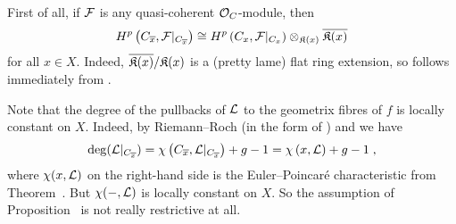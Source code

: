 \documentclass[a4paper,parskip=half,numbers=enddot, DIV=12]{scrreprt}
\begin{document}
\begin{rem}
	\begin{alphanumerate}
		\item {}First of all, if $\mathcal{F}$ is any quasi-coherent $\mathcal{O}_C$-module, then
		\begin{align}\lbl{eq:GeometricFibreIso}
		H^p\left(C_{\ov{x}},\Ff|_{C_{\ov{x}}}\right)\cong H^p\left(C_x,\Ff|_{C_x}\right)\otimes_{\KK(x)}\ov{\KK(x)}
		\end{align}
		for all $x\in X$. Indeed, $\overline{\mathfrak{K}(x)}/\mathfrak{K}(x)$ is a (pretty lame) flat ring extension, so  follows immediately from .
		\item Note that the degree of the pullbacks of $\mathcal{L}$ to the geometrix fibres of $f$ is locally constant on $X$. Indeed, by Riemann--Roch (in the form of \cite[Theorem~8]{alggeo2}) and  we have
		\begin{align*}
			\deg(\mathcal{L}|_{C_{\overline{x}}})=\chi\left(C_{\overline{x}},\mathcal{L}|_{C_{\overline{x}}}\right)+g-1=\chi\left(x,\mathcal{L}\right)+g-1\;,
		\end{align*}
		where $\chi(x,\mathcal{L})$ on the right-hand side is the Euler--Poincaré characteristic from Theorem~. But $\chi(-,\mathcal{L})$ is locally constant on $X$. So the assumption of Proposition~ is not really restrictive at all.
	\end{alphanumerate}
\end{rem}
\end{document}
